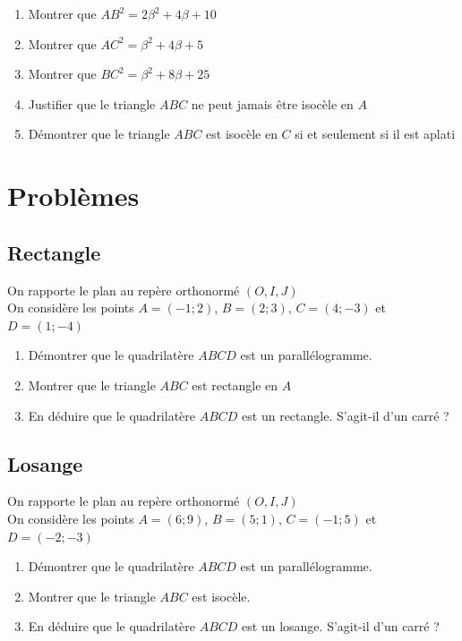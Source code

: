 \documentclass[oneside,12pt]{article}          %
\begin{document}
\begin{enumerate}
	\item Montrer que $AB^2=2\beta^2+4\beta+10$
	\item Montrer que $AC^2=\beta^2+4\beta+5$
	\item Montrer que $BC^2=\beta^2+8\beta+25$
	\item Justifier que le triangle $ABC$ ne peut jamais être isocèle en $A$
	\item Démontrer que le triangle $ABC$ est isocèle en $C$ si et seulement si il est aplati
\end{enumerate}




\section{Problèmes}

\subsection{Rectangle}
On rapporte le plan au repère orthonormé $(O,I,J)$\\
On considère les points $A=(-1;2)$, $B=(2;3)$, $C=(4;-3)$ et $D=(1;-4)$
\begin{enumerate}
	\item Démontrer que le quadrilatère $ABCD$ est un parallélogramme.
	\item Montrer que le triangle $ABC$ est rectangle en $A$
	\item En déduire que le quadrilatère $ABCD$ est un rectangle. S'agit-il d'un carré ?
\end{enumerate}



\subsection{Losange}
On rapporte le plan au repère orthonormé $(O,I,J)$\\
On considère les points $A=(6;9)$, $B=(5;1)$, $C=(-1;5)$ et $D=(-2;-3)$
\begin{enumerate}
	\item Démontrer que le quadrilatère $ABCD$ est un parallélogramme.
	\item Montrer que le triangle $ABC$ est isocèle.
	\item En déduire que le quadrilatère $ABCD$ est un losange. S'agit-il d'un carré ?
\end{enumerate}
\end{document}
